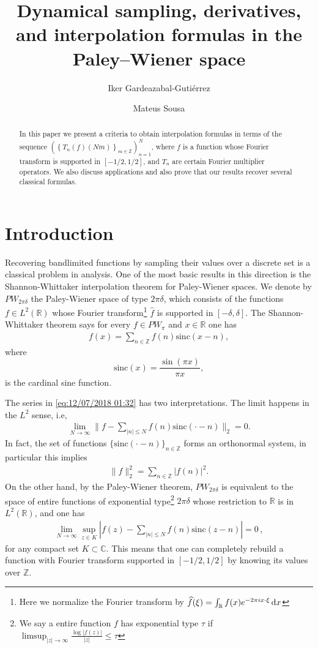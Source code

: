 \documentclass[reqno]{amsart}
\title{Dynamical sampling, derivatives, and interpolation formulas in the Paley--Wiener space}
\author[Gardeazabal]{Iker Gardeazabal-Gutiérrez}
\author[Sousa]{Mateus Sousa}
\theoremstyle{plain}
\theoremstyle{definition}
\numberwithin{equation}{section}
\newcommand{\Z}{{\mathbb Z}}
\newcommand{\R}{{\mathbb R}}
\newcommand{\C}{{\mathbb C}}
\newcommand{\dx}{\, \mathrm{d}x}
\newcommand{\pa}[1]{\left(#1\right)}
\newcommand{\suc}[1]{\left\{#1\right\}}
\renewcommand{\dx}{\,\text{\rm d}x}
\newcommand{\sinc}{\mathrm{sinc}}
\begin{document}
\begin{abstract}  
In this paper we present a criteria to obtain interpolation formulas  in terms of the sequence $\pa{\suc{T_n(f)(Nm)}_{m\in\Z}}_{n=1}^N$, where $f$ is a function whose Fourier transform is supported in $[-1/2,1/2]$, and $T_n$ are certain Fourier multiplier operators. We also discuss applications and also prove that our results recover several classical formulas. 
\end{abstract}

\maketitle

\section{Introduction}

Recovering bandlimited functions by sampling their values over a discrete set is a classical problem in analysis. One of the most basic results in this direction is the Shannon-Whittaker interpolation theorem for Paley-Wiener spaces. We denote by $PW_{2\pi\delta}$ the Paley-Wiener space of type $2\pi\delta$, which consists of the functions $f\in L^2(\R)$ whose Fourier transform\footnote{Here we normalize the Fourier transform by $\widehat{f}(\xi)=\int_\R f(x)e^{-2\pi ix\cdot \xi}\dx$} $\widehat{ f}$ is supported in $ [-\delta,\delta]$. The Shannon-Whittaker theorem says for every $f\in PW_\pi$ and $x\in \R$ one has
\begin{align}\label{eq:12/07/2018 01:32}
    f(x)=\sum_{n\in \Z}f(n)\sinc(x-n),
\end{align}
where 
$$\sinc(x)=\frac{\sin(\pi x)}{\pi x},$$
is the cardinal sine function. 


The series in \eqref{eq:12/07/2018 01:32} has two interpretations. The limit happens in the $L^2$ sense, i.e, 
\begin{align*}
    \lim_{N\rightarrow\infty}\|f-\sum_{|n|\leq N}f(n)\sinc(\cdot-n)\|_2= 0.
\end{align*}
In fact, the set of functions $\{\sinc(\cdot-n)\}_{n\in\Z}$ forms an orthonormal system, in particular this implies
\begin{align*}
    \|f\|_2^2=\sum_{n\in\Z}|f(n)|^2.
\end{align*}
On the other hand, by the Paley-Wiener theorem, $PW_{2\pi\delta}$ is equivalent to the space of entire functions of exponential type\footnote{We say a entire function $f$ has exponential type $\tau$ if $\limsup_{|z|\rightarrow\infty}\tfrac{\log|f(z)|}{|z|}\leq \tau$} $2\pi\delta$ whose restriction to $\R$ is in $L^2(\R)$, and one has  
\begin{align}\label{eq:12/07/2018 02:32}
        \lim_{N\rightarrow\infty}{\sup_{z \in K}\left|f(z)-\sum_{|n|\leq N}f(n)\sinc(z-n)\right|}=0\, ,
\end{align}
for any compact set $K\subset \C$. This means that one can completely rebuild a function with Fourier transform supported in $[-1/2,1/2]$ by knowing its values over $\Z$. 
\end{document}
